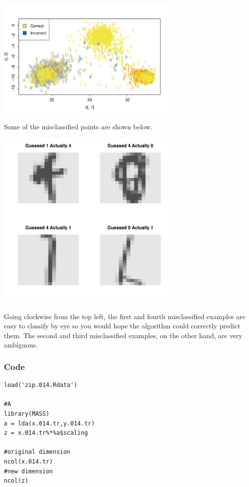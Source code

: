 \documentclass[10pt]{article}
\newcommand{\1}{\mathbbm{1}}
\begin{document}
\begin{enumerate}
\begin{enumerate}[(a)]
\begin{center}
\includegraphics[width=3.5in]{prob5_d_1.pdf}
\end{center}
Some of the misclassified points are shown below.
\begin{center}
\includegraphics[width=3.5in]{prob5_d_2.pdf}
\end{center}
Going clockwise from the top left, the first and fourth misclassified examples are easy to classify by eye so you would hope the algorithm could correctly predict them. The second and third misclassified examples, on the other hand, are very ambiguous.
\end{enumerate}
\subsubsection*{Code}
{\scriptsize
\begin{verbatim}
load('zip.014.Rdata')

#A
library(MASS)
a = lda(x.014.tr,y.014.tr)
z = x.014.tr%*%a$scaling

#original dimension
ncol(x.014.tr)
#new dimension
ncol(z)


\end{verbatim}}
\end{enumerate}
\end{document}
